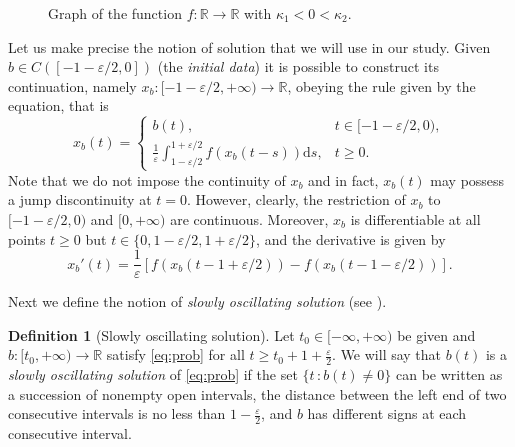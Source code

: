 \documentclass[a4paper,11pt]{article}
\theoremstyle{plain}
\theoremstyle{definition}
\newtheorem{definition}{Definition}[section]
\theoremstyle{definition}
\newcommand{\R}{\mathbb{R}}
\newcommand{\dd}{\mathrm{d}}
\numberwithin{equation}{section}
\begin{document}
\begin{figure}[t]
    \centering
    \caption{Graph of the function $f\colon \R \to \R$ with $\kappa_1<0<\kappa_2$.}
    \label{fig:1}
\end{figure}

Let us make precise the notion of solution that we will use in our study.  Given $b\in C([-1-\varepsilon/2,0])$ (the \textit{initial data}) it is possible to construct its continuation, namely $x_b\colon [-1-\varepsilon/2,+\infty) \to\R$, obeying the rule given by the equation, that is
\begin{equation}\label{eq:xb}
    x_b(t) = \begin{cases}
        b(t), & t\in[-1-\varepsilon/2, 0), \\
        \frac{1}{\varepsilon}\int_{1-\varepsilon/2}^{1+\varepsilon/2} f(x_b(t-s)) \dd s, & t\geq 0.
    \end{cases}
\end{equation}
Note that we do not impose the continuity of $x_b$ and in fact, $x_b(t)$ may possess a jump discontinuity at $t=0$. However, clearly, the restriction of $x_b$ to $[-1-\varepsilon/2, 0)$ and $[0, +\infty)$ are continuous. Moreover, $x_b$ is differentiable at all points $t\geq 0$ but $t\in\{0, 1-\varepsilon/2, 1+ \varepsilon/2 \}$, and the derivative is given by
\[
    x_b'(t) = \frac{1}{\varepsilon} [ f(x_b(t-1+\varepsilon/2)) - f(x_b(t-1-\varepsilon/2)) ].
\]


Next we define the notion of \textit{slowly oscillating solution} (see \cite[Definition 3.8]{Arino}).
\begin{definition}[Slowly oscillating solution]\label{def:slowly-oscillating}
    Let $t_0\in [-\infty, +\infty)$ be given and  $b:[t_0, +\infty)\to \mathbb{R}$ satisfy \eqref{eq:prob} for all $t\geq t_0+1+\frac{\varepsilon}{2}$. We will say that  $b(t)$ is a \textit{slowly oscillating solution} of \eqref{eq:prob} if the set $\{t\,:b(t)\neq 0\}$ can be written as a succession of nonempty open intervals, the distance between the left end of two consecutive intervals is no less than $1-\frac{\varepsilon}{2}$, and $b$ has different signs at each consecutive interval.  
\end{definition}
\end{document}
